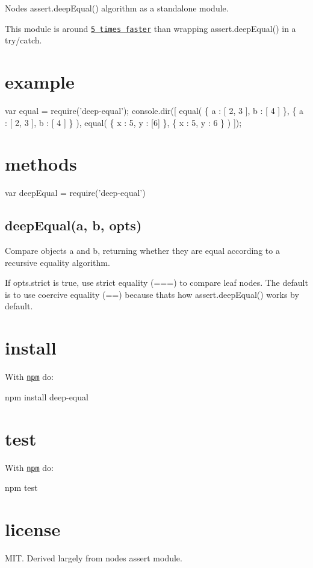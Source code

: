 Node\textquotesingle{}s {\ttfamily assert.\+deep\+Equal() algorithm} as a standalone module.

This module is around \href{https://gist.github.com/2790507}{\tt 5 times faster} than wrapping {\ttfamily assert.\+deep\+Equal()} in a {\ttfamily try/catch}.

\href{https://ci.testling.com/substack/node-deep-equal}{\tt }

\href{https://travis-ci.org/substack/node-deep-equal}{\tt }

\section*{example}


\begin{DoxyCode}
var equal = require('deep-equal');
console.dir([
    equal(
        \{ a : [ 2, 3 ], b : [ 4 ] \},
        \{ a : [ 2, 3 ], b : [ 4 ] \}
    ),
    equal(
        \{ x : 5, y : [6] \},
        \{ x : 5, y : 6 \}
    )
]);
\end{DoxyCode}


\section*{methods}


\begin{DoxyCode}
var deepEqual = require('deep-equal')
\end{DoxyCode}


\subsection*{deep\+Equal(a, b, opts)}

Compare objects {\ttfamily a} and {\ttfamily b}, returning whether they are equal according to a recursive equality algorithm.

If {\ttfamily opts.\+strict} is {\ttfamily true}, use strict equality ({\ttfamily ===}) to compare leaf nodes. The default is to use coercive equality ({\ttfamily ==}) because that\textquotesingle{}s how {\ttfamily assert.\+deep\+Equal()} works by default.

\section*{install}

With \href{http://npmjs.org}{\tt npm} do\+:


\begin{DoxyCode}
npm install deep-equal
\end{DoxyCode}


\section*{test}

With \href{http://npmjs.org}{\tt npm} do\+:


\begin{DoxyCode}
npm test
\end{DoxyCode}


\section*{license}

M\+IT. Derived largely from node\textquotesingle{}s assert module. 